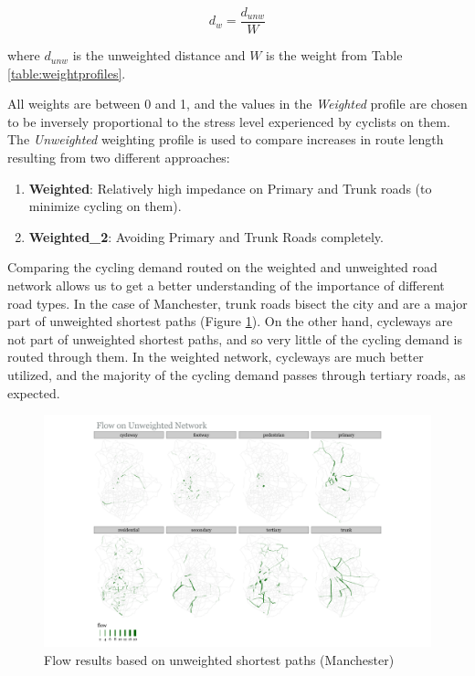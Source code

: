 \documentclass[
]{article}
\providecommand{\tightlist}{%
  \setlength{\itemsep}{0pt}\setlength{\parskip}{0pt}}
\begin{document}
\begin{equation}\label{eq:weight_distance}
    d_{w} = \frac{d_{unw}}{W}
\end{equation}

\noindent where \(d_{unw}\) is the unweighted distance and \(W\) is the weight from Table \ref{table:weightprofiles}.

All weights are between 0 and 1, and the values in the \textit{Weighted} profile are chosen to be inversely proportional to the stress level experienced by cyclists on them.
The \textit{Unweighted} weighting profile is used to compare increases in route length resulting from two different approaches:

\begin{enumerate}
\def\labelenumi{\arabic{enumi}.}
\tightlist
\item
  \textbf{Weighted}: Relatively high impedance on Primary and Trunk roads (to minimize cycling on them).
\item
  \textbf{Weighted\_2}: Avoiding Primary and Trunk Roads completely.
\end{enumerate}

Comparing the cycling demand routed on the weighted and unweighted road network allows us to get a better understanding of the importance of different road types.
In the case of Manchester, trunk roads bisect the city and are a major part of unweighted shortest paths (Figure \ref{fig:flowsfacetunweighted}).
On the other hand, cycleways are not part of unweighted shortest paths, and so very little of the cycling demand is routed through them.
In the weighted network, cycleways are much better utilized, and the majority of the cycling demand passes through tertiary roads, as expected.

\begin{figure}
\includegraphics[width=0.9\linewidth]{data/Manchester/Plots/flows_facet_unweighted_Manchester} \caption{Flow results based on unweighted shortest paths (Manchester)}\label{fig:flowsfacetunweighted}
\end{figure}
\end{document}
